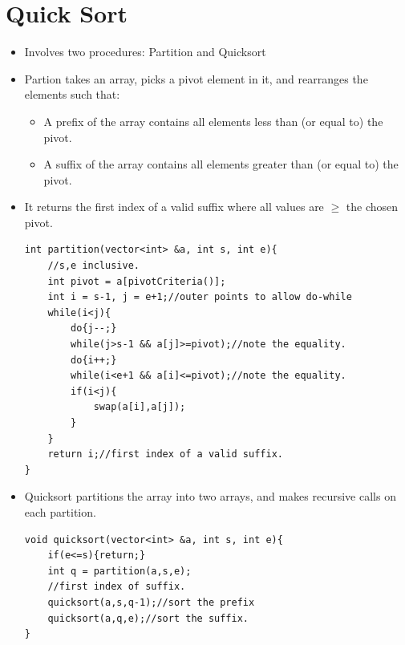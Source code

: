 \documentclass{report}
\begin{document}
\section{Quick Sort}
\begin{itemize}
\item Involves two procedures: Partition and Quicksort
\item Partion takes an array, picks a pivot element in it, and rearranges the elements such that:
\begin{itemize}
    \item A prefix of the array contains all elements less than (or equal to) the pivot.
    \item A suffix of the array contains all elements greater than (or equal to) the pivot.
\end{itemize}
\item It returns the first index of a valid suffix where all values are $\ge$ the chosen pivot.
\begin{lstlisting}
int partition(vector<int> &a, int s, int e){
    //s,e inclusive.
    int pivot = a[pivotCriteria()];
    int i = s-1, j = e+1;//outer points to allow do-while
    while(i<j){
        do{j--;}
        while(j>s-1 && a[j]>=pivot);//note the equality.
        do{i++;}
        while(i<e+1 && a[i]<=pivot);//note the equality.
        if(i<j){
            swap(a[i],a[j]);
        }
    }
    return i;//first index of a valid suffix.
}
\end{lstlisting}
\item Quicksort partitions the array into two arrays, and makes recursive calls on each partition.
\begin{lstlisting}
void quicksort(vector<int> &a, int s, int e){
    if(e<=s){return;}
    int q = partition(a,s,e);
    //first index of suffix.
    quicksort(a,s,q-1);//sort the prefix
    quicksort(a,q,e);//sort the suffix.
}
\end{lstlisting}
\end{itemize}
\end{document}
